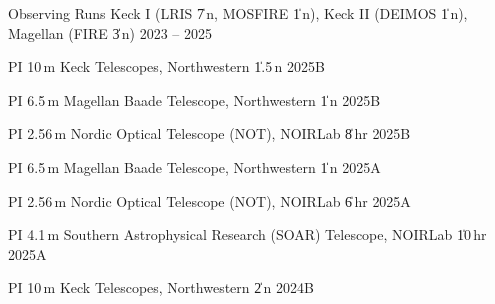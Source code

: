 


\begin{cventries}


\cvsimpentry
    {Observing Runs}
    {Keck I (LRIS \| 7\,n, MOSFIRE \| 1\,n), Keck II (DEIMOS \| 1\,n), Magellan (FIRE \| 3\,n)}
    {2023 -- 2025}
    {}

\cvsimpentry
    {PI}
    {10\,m Keck Telescopes, Northwestern \| 1.5\,n}
    {2025B}
    {}

\cvsimpentry
    {PI}
    {6.5\,m Magellan Baade Telescope, Northwestern \| 1\,n}
    {2025B}
    {}

\cvsimpentry
    {PI}
    {2.56\,m Nordic Optical Telescope (NOT), NOIRLab \| 8\,hr}
    {2025B}
    {}

\cvsimpentry
    {PI}
    {6.5\,m Magellan Baade Telescope, Northwestern \| 1\,n}
    {2025A}
    {}

\cvsimpentry
    {PI}
    {2.56\,m Nordic Optical Telescope (NOT), NOIRLab \| 6\,hr}
    {2025A}
    {}

\cvsimpentry
    {PI}
    {4.1\,m Southern Astrophysical Research (SOAR) Telescope, NOIRLab \| 10\,hr}
    {2025A}
    {}
    
\cvsimpentry
    {PI}
    {10\,m Keck Telescopes, Northwestern \| 2\,n}
    {2024B}
    {}







\end{cventries}